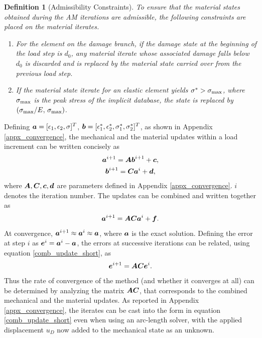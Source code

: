 \documentclass[10pt,review]{cas-sc}
\newtheorem{definition}{Definition}
\begin{document}
\begin{definition}[Admissibility Constraints]\label{def:branch_restrictions}
	To ensure that the material states obtained during the AM iterations are admissible, the following constraints are placed on the material iterates.
	\begin{enumerate}
		\item\label{br:irreversibility} For the element on the damage branch, if the damage state at the beginning of the load step is $d_0$, any material iterate whose associated damage falls below $d_0$ is discarded and is replaced by the material state carried over from the previous load step.
		\item\label{br:peak_cap} If the material state iterate for an elastic element yields $\sigma^* > \sigma_{\rm max}$, where $\sigma_{\rm max}$ is the peak stress of the implicit database, the state is replaced by $(\sigma_{\rm max}/E,\,\sigma_{\rm max})$.
	\end{enumerate}
\end{definition}	

Defining $\mbox{\boldmath $a$} = [\epsilon_1,\epsilon_2,\sigma]^T$, $\mbox{\boldmath $b$} = [\epsilon^*_1,\epsilon^*_2,\sigma^*_1,\sigma^*_2]^T$, as shown in Appendix \ref{appx_convergence}, the mechanical and the material updates within a load increment can be written concisely as 
\begin{gather}
	\mbox{\boldmath $a$}^{i+1} = \mbox{\boldmath $A$} \mbox{\boldmath $b$}^{i+1} + \mbox{\boldmath $c$}, \label{mech_update_short}\\
	\mbox{\boldmath $b$}^{i+1} = \mbox{\boldmath $C$} \mbox{\boldmath $a$}^{i} + \mbox{\boldmath $d$},  \label{mat_update_short}
\end{gather} 
where $\mbox{\boldmath $A$},\mbox{\boldmath $C$},\mbox{\boldmath $c$},\mbox{\boldmath $d$}$ are parameters defined in Appendix \ref{appx_convergence}. $i$ denotes the iteration number. The updates can be combined and written together as
\begin{equation}
	\mbox{\boldmath $a$}^{i+1} =  \mbox{\boldmath $A$}  \mbox{\boldmath $C$}	\mbox{\boldmath $a$}^{i} + \mbox{\boldmath $f$}.\label{comb_update_short}
\end{equation}
At convergence, $\mbox{\boldmath $a$}^{i+1} \approx \mbox{\boldmath $a$}^{i} \approx \mbox{\boldmath $a$}$, where $\mbox{\boldmath $a$}$ is the exact solution. Defining the error at step $i$ as $\mbox{\boldmath $e$}^i = \mbox{\boldmath $a$}^{i} - \mbox{\boldmath $a$}$, the errors at successive iterations can be related, using equation \ref{comb_update_short}, as
\begin{equation}
	\mbox{\boldmath $e$}^{i+1} =  \mbox{\boldmath $A$}  \mbox{\boldmath $C$}	\mbox{\boldmath $e$}^{i}.
\end{equation}
Thus the rate of convergence of the method (and whether it converges at all) can be determined by analyzing the matrix $\mbox{\boldmath $A$} \mbox{\boldmath $C$} $, that corresponds to the combined mechanical and the material updates. As reported in Appendix \ref{appx_convergence}, the iterates can be cast into the form in equation \ref{comb_update_short} even when using an arc-length solver, with the applied displacement $u_D$ now added to the mechanical state as an unknown.
\end{document}
